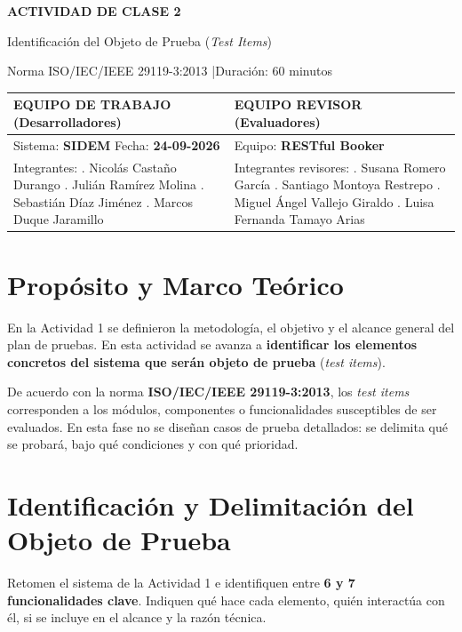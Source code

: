\documentclass[11pt,letterpaper]{article}
\begin{document}
\begin{center}
{\Large\bfseries ACTIVIDAD DE CLASE 2}\par\vspace{3pt}
{\large Identificación del Objeto de Prueba (\textit{Test Items})}\par\vspace{2pt}
{\small Norma ISO/IEC/IEEE 29119-3:2013 \quad|\quad Duración: 60 minutos}
\end{center}
\vspace{6pt}

\noindent
\begin{tabularx}{\textwidth}{|Y|Y|}
\hline
\textbf{EQUIPO DE TRABAJO} (Desarrolladores) & \textbf{EQUIPO REVISOR} (Evaluadores) \\
\hline
Sistema: \textbf{SIDEM} \newline Fecha: \textbf{24-09-2026} & Equipo: \textbf{RESTful Booker} \\
\hline
Integrantes: . Nicolás Castaño Durango . Julián Ramírez Molina . Sebastián Díaz Jiménez . Marcos Duque Jaramillo
&
Integrantes revisores: . Susana Romero García . Santiago Montoya Restrepo . Miguel Ángel Vallejo Giraldo . Luisa Fernanda Tamayo Arias \\
\hline
\end{tabularx}

\section{Propósito y Marco Teórico}
En la Actividad 1 se definieron la metodología, el objetivo y el alcance general del plan de pruebas. En esta actividad se avanza a \textbf{identificar los elementos concretos del sistema que serán objeto de prueba} (\textit{test items}).

De acuerdo con la norma \textbf{ISO/IEC/IEEE 29119-3:2013}, los \textit{test items} corresponden a los módulos, componentes o funcionalidades susceptibles de ser evaluados. En esta fase no se diseñan casos de prueba detallados: se delimita qué se probará, bajo qué condiciones y con qué prioridad.

\section{Identificación y Delimitación del Objeto de Prueba}
Retomen el sistema de la Actividad 1 e identifiquen entre \textbf{6 y 7 funcionalidades clave}. Indiquen qué hace cada elemento, quién interactúa con él, si se incluye en el alcance y la razón técnica.
\end{document}
